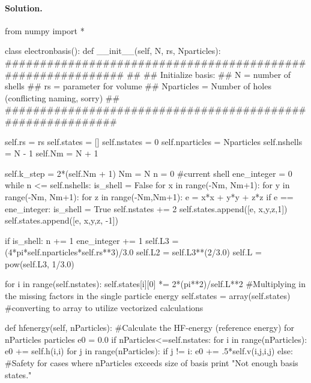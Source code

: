 \documentclass[%
oneside,                 %
final,                   %
10pt]{article}
\newenvironment{doconceexercise}{}{}
\begin{document}
\begin{doconceexercise}
\paragraph{Solution.}
\bpycod
from numpy import *

class electronbasis():
    def __init__(self, N, rs, Nparticles):
        ############################################################
        ##
        ##  Initialize basis: 
        ##  N = number of shells
        ##  rs = parameter for volume 
        ##  Nparticles = Number of holes (conflicting naming, sorry)
        ##
        ###########################################################
        
        self.rs = rs
        self.states = []
        self.nstates = 0
        self.nparticles = Nparticles
        self.nshells = N - 1
        self.Nm = N + 1
        
        self.k_step = 2*(self.Nm + 1)
        Nm = N
        n = 0 #current shell
        ene_integer = 0
        while n <= self.nshells:
            is_shell = False
            for x in range(-Nm, Nm+1):
                for y in range(-Nm, Nm+1):
                    for z in range(-Nm,Nm+1):
                        e = x*x + y*y + z*z
                        if e   == ene_integer:
                            is_shell = True
                            self.nstates += 2
                            self.states.append([e, x,y,z,1])
                            self.states.append([e, x,y,z, -1])
                            
            if is_shell:
                n += 1
            ene_integer += 1
        self.L3 = (4*pi*self.nparticles*self.rs**3)/3.0
        self.L2 = self.L3**(2/3.0)
        self.L = pow(self.L3, 1/3.0)
        
        for i in range(self.nstates):
            self.states[i][0] *= 2*(pi**2)/self.L**2 #Multiplying in the missing factors in the single particle energy
        self.states = array(self.states) #converting to array to utilize vectorized calculations    
        
    def hfenergy(self, nParticles):
        #Calculate the HF-energy (reference energy) for nParticles particles
        e0 = 0.0
        if nParticles<=self.nstates:
            for i in range(nParticles):
                e0 += self.h(i,i)
                for j in range(nParticles):
                    if j != i:
                        e0 += .5*self.v(i,j,i,j)
        else:
            #Safety for cases where nParticles exceeds size of basis
            print "Not enough basis states."
            

\end{doconceexercise}
\end{document}
